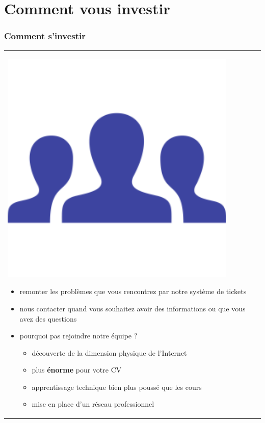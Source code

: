 \documentclass[handout]{beamer}
\begin{document}
	\section{Comment vous investir}
	\begin{frame}
	\frametitle{Comment s'investir}

	\begin{tabular}{l l}
		\begin{minipage}{0.2\textwidth}
			\begin{center}
				\includegraphics[width=0.9\textwidth]{images/equipe.png}
			\end{center}
		\end{minipage}

		\begin{minipage}{0.8\textwidth}
			\begin{itemize}
				\item remonter les problèmes que vous rencontrez par notre système de tickets
				\item nous contacter quand vous souhaitez avoir des informations ou que vous avez des questions
				\item pourquoi pas rejoindre notre équipe ?
				\begin{itemize}
					\item découverte de la dimension physique de l'Internet
					\item plus \textbf{énorme} pour votre CV
					\item apprentissage technique bien plus poussé que les cours
					\item mise en place d'un réseau professionnel
				\end{itemize}
			\end{itemize}
		\end{minipage}
		
	\end{tabular}
	\end{frame}


\end{document}
